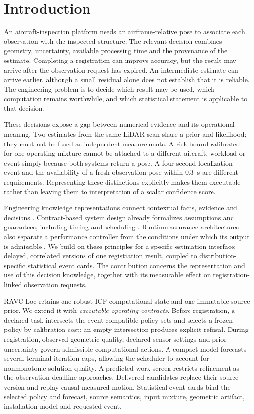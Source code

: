 
\section{Introduction}
An aircraft-inspection platform needs an airframe-relative pose to associate each observation with the inspected structure. The relevant decision combines geometry, uncertainty, available processing time and the provenance of the estimate. Completing a registration can improve accuracy, but the result may arrive after the observation request has expired. An intermediate estimate can arrive earlier, although a small residual alone does not establish that it is reliable. The engineering problem is to decide which result may be used, which computation remains worthwhile, and which statistical statement is applicable to that decision.

These decisions expose a gap between numerical evidence and its operational meaning. Two estimates from the same LiDAR scan share a prior and likelihood; they must not be fused as independent measurements. A risk bound calibrated for one operating mixture cannot be attached to a different aircraft, workload or event simply because both systems return a pose. A four-second localization event and the availability of a fresh observation pose within 0.3~s are different requirements. Representing these distinctions explicitly makes them executable rather than leaving them to interpretation of a scalar confidence score.

Engineering knowledge representations connect contextual facts, evidence and decisions \cite{wang2021process,hao2021knowledge,su2025manufacturing}. Contract-based system design already formalizes assumptions and guarantees, including timing and scheduling \cite{benveniste2018contracts}. Runtime-assurance architectures also separate a performance controller from the conditions under which its output is admissible \cite{mehmood2022simplex}. We build on these principles for a specific estimation interface: delayed, correlated versions of one registration result, coupled to distribution-specific statistical event cards. The contribution concerns the representation and use of this decision knowledge, together with its measurable effect on registration-linked observation requests.

RAVC-Loc retains one robust ICP computational state and one immutable source prior. We extend it with \emph{executable operating contracts}. Before registration, a declared task intersects the event-compatible policy sets and selects a frozen policy by calibration cost; an empty intersection produces explicit refusal. During registration, observed geometric quality, declared sensor settings and prior uncertainty govern admissible computational actions. A compact model forecasts several terminal iteration caps, allowing the scheduler to account for nonmonotonic solution quality. A predicted-work screen restricts refinement as the observation deadline approaches. Delivered candidates replace their source version and replay causal measured motion. Statistical event cards bind the selected policy and forecast, source semantics, input mixture, geometric artifact, installation model and requested event.

